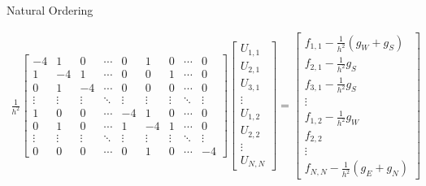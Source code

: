 \begin{definition}{Natural Ordering}{}
  \begin{align*}
    \frac{1}{h^2}
    \begin{bmatrix}
      -4     & 1      & 0      & \cdots & 0      & 1      & 0      & \cdots & 0      \\
      1      & -4     & 1      & \cdots & 0      & 0      & 1      & \cdots & 0      \\
      0      & 1      & -4     & \cdots & 0      & 0      & 0      & \cdots & 0      \\
      \vdots & \vdots & \vdots & \ddots & \vdots & \vdots & \vdots & \ddots & \vdots \\
      1      & 0      & 0      & \cdots & -4     & 1      & 0      & \cdots & 0      \\
      0      & 1      & 0      & \cdots & 1      & -4     & 1      & \cdots & 0      \\
      \vdots & \vdots & \vdots & \ddots & \vdots & \vdots & \vdots & \ddots & \vdots \\
      0      & 0      & 0      & \cdots & 0      & 1      & 0      & \cdots & -4
    \end{bmatrix}
    \begin{bmatrix}
      U_{1,1} \\
      U_{2,1} \\
      U_{3,1} \\
      \vdots  \\
      U_{1,2} \\
      U_{2,2} \\
      \vdots  \\
      U_{N,N}
    \end{bmatrix}
    =
    \begin{bmatrix}
      f_{1,1} - \frac{1}{h^2}(g_W + g_S) \\
      f_{2,1} - \frac{1}{h^2}g_S         \\
      f_{3,1} - \frac{1}{h^2}g_S         \\
      \vdots                             \\
      f_{1,2} - \frac{1}{h^2}g_W         \\
      f_{2,2}                            \\
      \vdots                             \\
      f_{N,N} - \frac{1}{h^2}(g_E + g_N)
    \end{bmatrix}
  \end{align*}
\end{definition}

